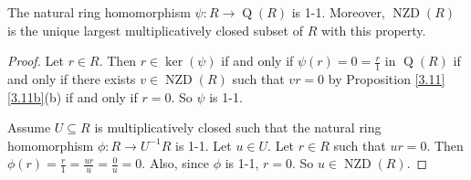 \begin{example*}
\begin{enumerate}
\begin{comment}
                    \draw[|->] (r) to node {} (qr);
                    \draw[|->,bend right] (r) to node {} (l);
                    \draw[|->,bend left=45] (qr) to node {} (l);
                    \draw[|->] (qru) to node {} (lu);
                \end{tikzpicture}
                \ \ \ \ \ \ 
                \begin{tikzpicture}[node distance = 1.5cm, auto]
                    \node (R) {$R_2$};
                    \node (QR)[right of=R] {$\operatorname{Q}(R_2)$};
                    \node (L)[below of=QR] {$U^{-1}R_2$};
                    \node (r)[node distance=0.7cm, left of=R, above of=R] {$r_2$};
                    \node (qr)[node distance=0.7cm, right of=QR, above of=QR] {$\frac{r_2}{1}$};
                    \node (qru)[node distance=1.6cm, right of=QR] {$\frac{r_2}{u_2}$};
                    \node (lu)[below of=qru] {$\frac{\varphi_2(r_2)}{\varphi_2(u_2)}$};
                    \node (l)[node distance=0.7cm, below of=L] {$r_2/1 = \frac{r_2/1}{1/1}$};
                    \draw[->] (R) to node {$\psi_2$} (QR);
                    \draw[right hook->] (R) to node [swap]{$\varphi_2$} (L);
                    \draw[->,dashed] (QR) to node {$\ex !\ \overbar \varphi_2$} (L);
                    \draw[|->] (r) to node {} (qr);
                    \draw[|->,bend right] (r) to node {} (l);
                    \draw[|->,bend left=45] (qr) to node {} (l);
                    \draw[|->] (qru) to node {} (lu);
                \end{tikzpicture}
            \end{center}
            Thus, $\operatorname{Q}(R) \cong \operatorname{Q}(R/\langle \overbar{X}, \overbar{Z} \rangle) \times \operatorname{Q}(R/\langle \overbar{Y}, \overbar{W} \rangle) \cong \operatorname{Q}(k[Y,W]) \times \operatorname{Q}(k[X,Z]) \cong k(X,Z) \times k(Y,W)$ by (a).
        \end{comment}
    \end{enumerate}
\end{example*}

\begin{proposition}\label{3.21}
    The natural ring homomorphism $\psi: R \to \operatorname{Q}(R)$ is 1-1. Moreover, $\operatorname{NZD}(R)$ is the unique largest multiplicatively closed subset of $R$ with this property.
\end{proposition}

\begin{proof}
    Let $r \in R$. Then $r \in \ker(\psi)$ if and only if $\psi(r) = 0 = \frac{r}{1}$ in $\operatorname{Q}(R)$ if and only if there exists $v \in \operatorname{NZD}(R)$ such that $vr = 0$ by Proposition \ref{3.11}\ref{3.11b}(b) if and only if $r = 0$. So $\psi$ is 1-1. \par
    Assume $U \subseteq R$ is multiplicatively closed such that the natural ring homomorphism $\phi: R \to U^{-1}R$ is 1-1. Let $u \in U$. Let $r \in R$ such that $ur = 0$. Then $\phi(r) = \frac{r}{1} = \frac{ur}{u} = \frac{0}{u} = 0$. Also, since $\phi$ is 1-1, $r = 0$. So $u \in \operatorname{NZD}(R)$.
\end{proof}

